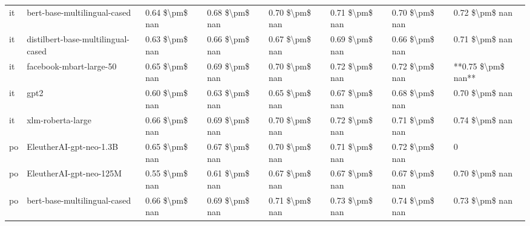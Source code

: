 \begin{tabular}{llllllll}
      it &       bert-base-multilingual-cased & 0.64 \$\textbackslash pm\$ nan &            0.68 \$\textbackslash pm\$ nan &        0.70 \$\textbackslash pm\$ nan &         0.71 \$\textbackslash pm\$ nan &                          0.70 \$\textbackslash pm\$ nan &     0.72 \$\textbackslash pm\$ nan \\
      it & distilbert-base-multilingual-cased & 0.63 \$\textbackslash pm\$ nan &            0.66 \$\textbackslash pm\$ nan &        0.67 \$\textbackslash pm\$ nan &         0.69 \$\textbackslash pm\$ nan &                          0.66 \$\textbackslash pm\$ nan &     0.71 \$\textbackslash pm\$ nan \\
      it &            facebook-mbart-large-50 & 0.65 \$\textbackslash pm\$ nan &            0.69 \$\textbackslash pm\$ nan &        0.70 \$\textbackslash pm\$ nan &         0.72 \$\textbackslash pm\$ nan &                          0.72 \$\textbackslash pm\$ nan & **0.75 \$\textbackslash pm\$ nan** \\
      it &                               gpt2 & 0.60 \$\textbackslash pm\$ nan &            0.63 \$\textbackslash pm\$ nan &        0.65 \$\textbackslash pm\$ nan &         0.67 \$\textbackslash pm\$ nan &                          0.68 \$\textbackslash pm\$ nan &     0.70 \$\textbackslash pm\$ nan \\
      it &                  xlm-roberta-large & 0.66 \$\textbackslash pm\$ nan &            0.69 \$\textbackslash pm\$ nan &        0.70 \$\textbackslash pm\$ nan &         0.72 \$\textbackslash pm\$ nan &                          0.71 \$\textbackslash pm\$ nan &     0.74 \$\textbackslash pm\$ nan \\
      po &            EleutherAI-gpt-neo-1.3B & 0.65 \$\textbackslash pm\$ nan &            0.67 \$\textbackslash pm\$ nan &        0.70 \$\textbackslash pm\$ nan &         0.71 \$\textbackslash pm\$ nan &                          0.72 \$\textbackslash pm\$ nan &                  0 \\
      po &            EleutherAI-gpt-neo-125M & 0.55 \$\textbackslash pm\$ nan &            0.61 \$\textbackslash pm\$ nan &        0.67 \$\textbackslash pm\$ nan &         0.67 \$\textbackslash pm\$ nan &                          0.67 \$\textbackslash pm\$ nan &     0.70 \$\textbackslash pm\$ nan \\
      po &       bert-base-multilingual-cased & 0.66 \$\textbackslash pm\$ nan &            0.69 \$\textbackslash pm\$ nan &        0.71 \$\textbackslash pm\$ nan &         0.73 \$\textbackslash pm\$ nan &                          0.74 \$\textbackslash pm\$ nan &     0.73 \$\textbackslash pm\$ nan \\

\end{tabular}
